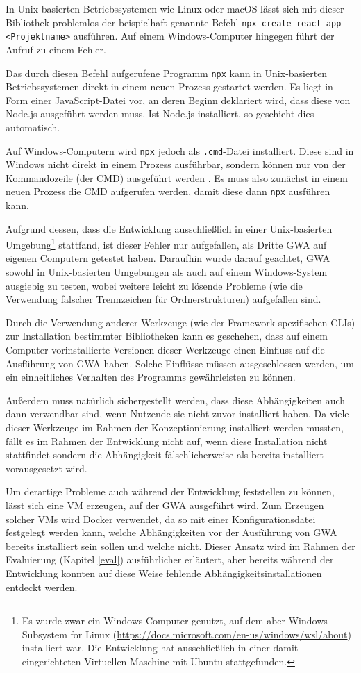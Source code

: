 In Unix-basierten Betriebssystemen wie Linux oder macOS lässt sich mit dieser Bibliothek problemlos der beispielhaft genannte Befehl \verb/npx create-react-app <Projektname>/ ausführen. Auf einem Windows-Computer hingegen führt der Aufruf zu einem Fehler.

Das durch diesen Befehl aufgerufene Programm \verb/npx/ kann in Unix-basierten Betriebssystemen direkt in einem neuen Prozess gestartet werden. Es liegt in Form einer JavaScript-Datei vor, an deren Beginn deklariert wird, dass diese von Node.js ausgeführt werden muss. Ist Node.js installiert, so geschieht dies automatisch.

Auf Windows-Computern wird \verb/npx/ jedoch als \verb/.cmd/-Datei installiert. Diese sind in Windows nicht direkt in einem Prozess ausführbar, sondern können nur von der Kommandozeile (der CMD) ausgeführt werden \cite{windows_spawn_cmd}. Es muss also zunächst in einem neuen Prozess die CMD aufgerufen werden, damit diese dann \verb/npx/ ausführen kann.

Aufgrund dessen, dass die Entwicklung ausschließlich in einer Unix-basierten Umgebung\footnote{Es wurde zwar ein Windows-Computer genutzt, auf dem aber Windows Subsystem for Linux (\url{https://docs.microsoft.com/en-us/windows/wsl/about}) installiert war. Die Entwicklung hat ausschließlich in einer damit eingerichteten Virtuellen Maschine mit Ubuntu stattgefunden.} stattfand, ist dieser Fehler nur aufgefallen, als Dritte \gls{GWA} auf eigenen Computern getestet haben. Daraufhin wurde darauf geachtet, \gls{GWA} sowohl in Unix-basierten Umgebungen als auch auf einem Windows-System ausgiebig zu testen, wobei weitere leicht zu lösende Probleme (wie die Verwendung falscher Trennzeichen für Ordnerstrukturen) aufgefallen sind.

Durch die Verwendung anderer Werkzeuge (wie der Framework-spezifischen \gls{CLI}s) zur Installation bestimmter Bibliotheken kann es geschehen, dass auf einem Computer vorinstallierte Versionen dieser Werkzeuge einen Einfluss auf die Ausführung von \gls{GWA} haben. Solche Einflüsse müssen ausgeschlossen werden, um ein einheitliches Verhalten des Programms gewährleisten zu können.

Außerdem muss natürlich sichergestellt werden, dass diese Abhängigkeiten auch dann verwendbar sind, wenn Nutzende sie nicht zuvor installiert haben. Da viele dieser Werkzeuge im Rahmen der Konzeptionierung installiert werden mussten, fällt es im Rahmen der Entwicklung nicht auf, wenn diese Installation nicht stattfindet sondern die Abhängigkeit fälschlicherweise als bereits installiert vorausgesetzt wird.

Um derartige Probleme auch während der Entwicklung feststellen zu können, lässt sich eine \gls{VM} erzeugen, auf der \gls{GWA} ausgeführt wird. Zum Erzeugen solcher \gls{VM}s wird Docker verwendet, da so mit einer Konfigurationsdatei festgelegt werden kann, welche Abhängigkeiten vor der Ausführung von \gls{GWA} bereits installiert sein sollen und welche nicht. Dieser Ansatz wird im Rahmen der Evaluierung (Kapitel \ref{eval}) ausführlicher erläutert, aber bereits während der Entwicklung konnten auf diese Weise fehlende Abhängigkeitsinstallationen entdeckt werden.
